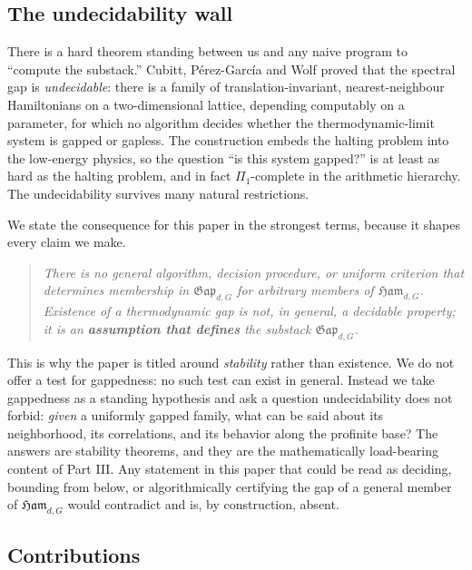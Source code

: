 \documentclass[12pt]{article}
\newcommand{\Ham}{\mathfrak{Ham}}              %
\newcommand{\Gap}{\mathfrak{Gap}}              %
\theoremstyle{plain}
\theoremstyle{definition}
\theoremstyle{remark}
\begin{document}
\subsection{The undecidability wall}
\label{sec:intro-wall}

There is a hard theorem standing between us and any naive program to ``compute the
substack.'' Cubitt, P\'erez-Garc\'ia and Wolf \cite{cpw-undecidable} proved that the
spectral gap is \emph{undecidable}: there is a family of translation-invariant,
nearest-neighbour Hamiltonians on a two-dimensional lattice, depending
computably on a parameter, for which no algorithm decides whether the
thermodynamic-limit system is gapped or gapless. The construction embeds the halting
problem into the low-energy physics, so the question ``is this system gapped?'' is at
least as hard as the halting problem, and in fact $\Pi_1$-complete in the arithmetic
hierarchy. The undecidability survives many natural restrictions.

We state the consequence for this paper in the strongest terms, because it shapes
every claim we make.

\begin{quote}
\emph{There is no general algorithm, decision procedure, or uniform criterion that
determines membership in $\Gap_{d,G}$ for arbitrary members of $\Ham_{d,G}$.
Existence of a thermodynamic gap is not, in general, a decidable property; it is an
\textbf{assumption that defines} the substack $\Gap_{d,G}$.}
\end{quote}

This is why the paper is titled around \emph{stability} rather than existence. We do
not offer a test for gappedness: no such test can exist in general. Instead we take
gappedness as a standing hypothesis and ask a question undecidability does not
forbid: \emph{given} a uniformly gapped family, what can be said about its
neighborhood, its correlations, and its behavior along the profinite base? The
answers are stability theorems, and they are the mathematically load-bearing content
of Part III\@. Any statement in this paper that could be read as deciding, bounding
from below, or algorithmically certifying the gap of a general member of $\Ham_{d,G}$
would contradict \cite{cpw-undecidable} and is, by construction, absent.

\subsection{Contributions}
\label{sec:intro-contrib}
\end{document}
